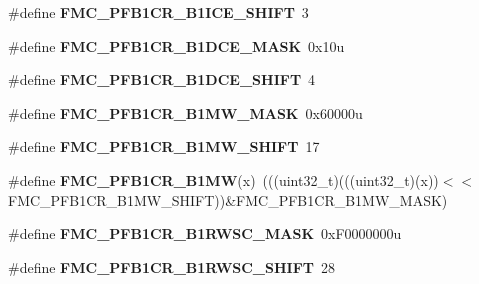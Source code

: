 \begin{DoxyCompactItemize}
\item 
\#define {\bfseries F\+M\+C\+\_\+\+P\+F\+B1\+C\+R\+\_\+\+B1\+I\+C\+E\+\_\+\+S\+H\+I\+FT}~3\hypertarget{group__FMC__Register__Masks_gab0d831cd340d45b11c048d8a51bb9e15}{}\label{group__FMC__Register__Masks_gab0d831cd340d45b11c048d8a51bb9e15}

\item 
\#define {\bfseries F\+M\+C\+\_\+\+P\+F\+B1\+C\+R\+\_\+\+B1\+D\+C\+E\+\_\+\+M\+A\+SK}~0x10u\hypertarget{group__FMC__Register__Masks_gaa101cb7bed362dfe0e710d0215b4b150}{}\label{group__FMC__Register__Masks_gaa101cb7bed362dfe0e710d0215b4b150}

\item 
\#define {\bfseries F\+M\+C\+\_\+\+P\+F\+B1\+C\+R\+\_\+\+B1\+D\+C\+E\+\_\+\+S\+H\+I\+FT}~4\hypertarget{group__FMC__Register__Masks_ga47fc3edc8a93d72c87293c77167eb953}{}\label{group__FMC__Register__Masks_ga47fc3edc8a93d72c87293c77167eb953}

\item 
\#define {\bfseries F\+M\+C\+\_\+\+P\+F\+B1\+C\+R\+\_\+\+B1\+M\+W\+\_\+\+M\+A\+SK}~0x60000u\hypertarget{group__FMC__Register__Masks_ga06524893e4c90b6159ef3dbd4ad4c876}{}\label{group__FMC__Register__Masks_ga06524893e4c90b6159ef3dbd4ad4c876}

\item 
\#define {\bfseries F\+M\+C\+\_\+\+P\+F\+B1\+C\+R\+\_\+\+B1\+M\+W\+\_\+\+S\+H\+I\+FT}~17\hypertarget{group__FMC__Register__Masks_ga2a6575dba057107bf40bb006ff912294}{}\label{group__FMC__Register__Masks_ga2a6575dba057107bf40bb006ff912294}

\item 
\#define {\bfseries F\+M\+C\+\_\+\+P\+F\+B1\+C\+R\+\_\+\+B1\+MW}(x)~(((uint32\+\_\+t)(((uint32\+\_\+t)(x))$<$$<$F\+M\+C\+\_\+\+P\+F\+B1\+C\+R\+\_\+\+B1\+M\+W\+\_\+\+S\+H\+I\+FT))\&F\+M\+C\+\_\+\+P\+F\+B1\+C\+R\+\_\+\+B1\+M\+W\+\_\+\+M\+A\+SK)\hypertarget{group__FMC__Register__Masks_ga57e60313cf505baa2cbfb48138a4d746}{}\label{group__FMC__Register__Masks_ga57e60313cf505baa2cbfb48138a4d746}

\item 
\#define {\bfseries F\+M\+C\+\_\+\+P\+F\+B1\+C\+R\+\_\+\+B1\+R\+W\+S\+C\+\_\+\+M\+A\+SK}~0x\+F0000000u\hypertarget{group__FMC__Register__Masks_ga3ab917a9071f70118eaabd80f2ec08e4}{}\label{group__FMC__Register__Masks_ga3ab917a9071f70118eaabd80f2ec08e4}

\item 
\#define {\bfseries F\+M\+C\+\_\+\+P\+F\+B1\+C\+R\+\_\+\+B1\+R\+W\+S\+C\+\_\+\+S\+H\+I\+FT}~28\hypertarget{group__FMC__Register__Masks_ga72daab1c5e2db3b1e521590edc2a153a}{}\label{group__FMC__Register__Masks_ga72daab1c5e2db3b1e521590edc2a153a}


\end{DoxyCompactItemize}
